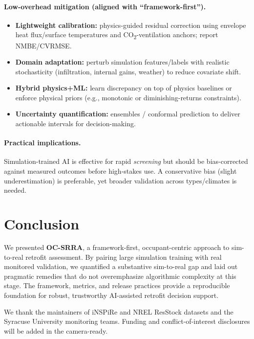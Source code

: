 \documentclass{article}
\begin{document}
\paragraph{Low-overhead mitigation (aligned with ``framework-first'').}
\begin{itemize}
  \item \textbf{Lightweight calibration:} physics-guided residual correction using envelope heat flux/surface temperatures and CO\textsubscript{2}-ventilation anchors; report NMBE/CVRMSE.
  \item \textbf{Domain adaptation:} perturb simulation features/labels with realistic stochasticity (infiltration, internal gains, weather) to reduce covariate shift.
  \item \textbf{Hybrid physics+ML:} learn discrepancy on top of physics baselines or enforce physical priors (e.g., monotonic or diminishing-returns constraints).
  \item \textbf{Uncertainty quantification:} ensembles / conformal prediction to deliver actionable intervals for decision-making.
\end{itemize}

\paragraph{Practical implications.}
Simulation-trained AI is effective for rapid \emph{screening} but should be bias-corrected against measured outcomes before high-stakes use. 
A conservative bias (slight underestimation) is preferable, yet broader validation across types/climates is needed.

\section{Conclusion}
We presented \textbf{OC-SRRA}, a framework-first, occupant-centric approach to sim-to-real retrofit assessment. 
By pairing large simulation training with real monitored validation, we quantified a substantive sim-to-real gap and laid out pragmatic remedies that do not overemphasize algorithmic complexity at this stage. 
The framework, metrics, and release practices provide a reproducible foundation for robust, trustworthy AI-assisted retrofit decision support.

\begin{ack}
We thank the maintainers of iNSPiRe and NREL ResStock datasets and the Syracuse University monitoring teams. 
Funding and conflict-of-interest disclosures will be added in the camera-ready.
\end{ack}
\end{document}
